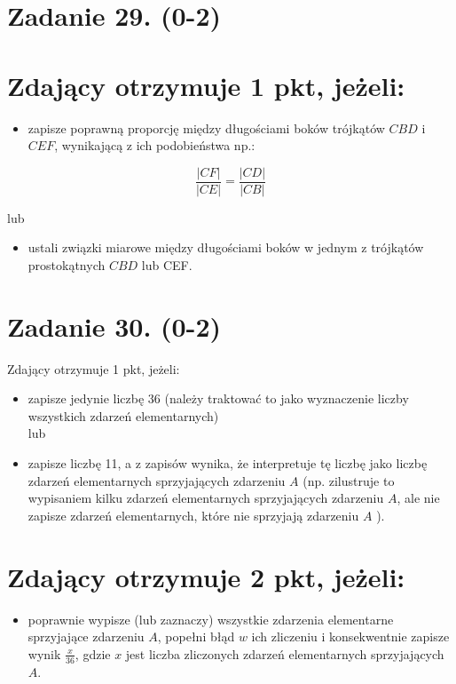 \documentclass[10pt]{article}
\begin{document}
\section*{Zadanie 29. (0-2)}
\section*{Zdający otrzymuje 1 pkt, jeżeli:}
\begin{itemize}
  \item zapisze poprawną proporcję między długościami boków trójkątów $C B D$ i $C E F$, wynikającą z ich podobieństwa np.:
\end{itemize}

$$
\frac{|C F|}{|C E|}=\frac{|C D|}{|C B|}
$$

lub

\begin{itemize}
  \item ustali związki miarowe między długościami boków w jednym z trójkątów prostokątnych $C B D$ lub CEF.
\end{itemize}

\section*{Zadanie 30. (0-2)}
Zdający otrzymuje 1 pkt, jeżeli:

\begin{itemize}
  \item zapisze jedynie liczbę 36 (należy traktować to jako wyznaczenie liczby wszystkich zdarzeń elementarnych)\\
lub
  \item zapisze liczbę 11, a z zapisów wynika, że interpretuje tę liczbę jako liczbę zdarzeń elementarnych sprzyjających zdarzeniu $A$ (np. zilustruje to wypisaniem kilku zdarzeń elementarnych sprzyjających zdarzeniu $A$, ale nie zapisze zdarzeń elementarnych, które nie sprzyjają zdarzeniu $A$ ).
\end{itemize}

\section*{Zdający otrzymuje 2 pkt, jeżeli:}
\begin{itemize}
  \item poprawnie wypisze (lub zaznaczy) wszystkie zdarzenia elementarne sprzyjające zdarzeniu $A$, popełni błąd $w$ ich zliczeniu i konsekwentnie zapisze wynik $\frac{x}{36}$, gdzie $x$ jest liczba zliczonych zdarzeń elementarnych sprzyjających $A$.
\end{itemize}
\end{document}
